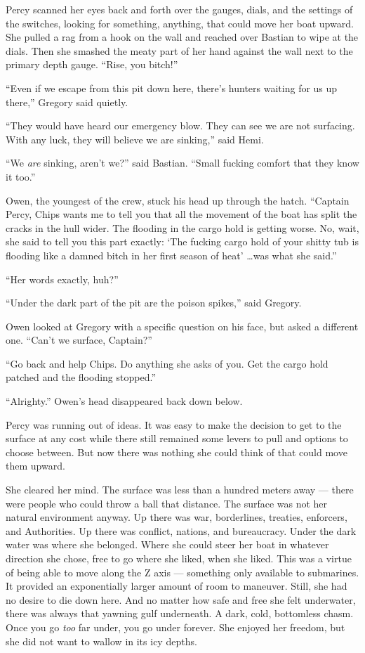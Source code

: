 \documentclass[
]{scrbook}
\begin{document}
Percy scanned her eyes back and forth over the gauges, dials, and the
settings of the switches, looking for something, anything, that could
move her boat upward. She pulled a rag from a hook on the wall and
reached over Bastian to wipe at the dials. Then she smashed the meaty
part of her hand against the wall next to the primary depth gauge.
``Rise, you bitch!''

``Even if we escape from this pit down here, there's hunters waiting for
us up there,'' Gregory said quietly.

``They would have heard our emergency blow. They can see we are not
surfacing. With any luck, they will believe we are sinking,'' said Hemi.

``We \emph{are} sinking, aren't we?'' said Bastian. ``Small fucking
comfort that they know it too.''

Owen, the youngest of the crew, stuck his head up through the hatch.
``Captain Percy, Chips wants me to tell you that all the movement of the
boat has split the cracks in the hull wider. The flooding in the cargo
hold is getting worse. No, wait, she said to tell you this part exactly:
`The fucking cargo hold of your shitty tub is flooding like a damned
bitch in her first season of heat' \ldots was what she said.''

``Her words exactly, huh?''

``Under the dark part of the pit are the poison spikes,'' said Gregory.

Owen looked at Gregory with a specific question on his face, but asked a
different one. ``Can't we surface, Captain?''

``Go back and help Chips. Do anything she asks of you. Get the cargo
hold patched and the flooding stopped.''

``Alrighty.'' Owen's head disappeared back down below.

\bigskip

Percy was running out of ideas. It was easy to make the decision to get
to the surface at any cost while there still remained some levers to
pull and options to choose between. But now there was nothing she could
think of that could move them upward.

She cleared her mind. The surface was less than a hundred meters away
--- there were people who could throw a ball that distance. The surface
was not her natural environment anyway. Up there was war, borderlines,
treaties, enforcers, and Authorities. Up there was conflict, nations,
and bureaucracy. Under the dark water was where she belonged. Where she
could steer her boat in whatever direction she chose, free to go where
she liked, when she liked. This was a virtue of being able to move along
the Z axis --- something only available to submarines. It provided an
exponentially larger amount of room to maneuver. Still, she had no
desire to die down here. And no matter how safe and free she felt
underwater, there was always that yawning gulf underneath. A dark, cold,
bottomless chasm. Once you go \emph{too} far under, you go under
forever. She enjoyed her freedom, but she did not want to wallow in its
icy depths.
\end{document}
